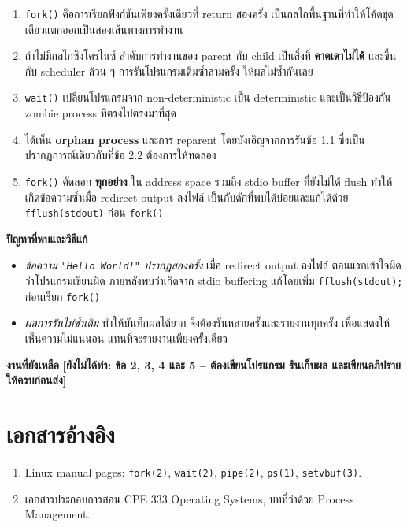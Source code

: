 \documentclass[a4paper,12pt]{article}
\newcommand{\code}[1]{\texttt{#1}}
\newcommand{\todo}[1]{\textcolor{todored}{\textbf{[ยังไม่ได้ทำ: #1]}}}
\begin{document}
\begin{enumerate}[leftmargin=*]
  \item \code{fork()} คือการเรียกฟังก์ชันเพียงครั้งเดียวที่ return สองครั้ง
        เป็นกลไกพื้นฐานที่ทำให้โค้ดชุดเดียวแตกออกเป็นสองเส้นทางการทำงาน
  \item ถ้าไม่มีกลไกซิงโครไนซ์ ลำดับการทำงานของ parent กับ child เป็นสิ่งที่
        \textbf{คาดเดาไม่ได้} และขึ้นกับ scheduler ล้วน ๆ การรันโปรแกรมเดิมซ้ำสามครั้ง
        ให้ผลไม่ซ้ำกันเลย
  \item \code{wait()} เปลี่ยนโปรแกรมจาก non-deterministic เป็น deterministic
        และเป็นวิธีป้องกัน zombie process ที่ตรงไปตรงมาที่สุด
  \item ได้เห็น \textbf{orphan process} และการ reparent โดยบังเอิญจากการรันข้อ 1.1
        ซึ่งเป็นปรากฏการณ์เดียวกับที่ข้อ 2.2 ต้องการให้ทดลอง
  \item \code{fork()} คัดลอก \textbf{ทุกอย่าง} ใน address space รวมถึง stdio buffer
        ที่ยังไม่ได้ flush ทำให้เกิดข้อความซ้ำเมื่อ redirect output ลงไฟล์
        เป็นกับดักที่พบได้บ่อยและแก้ได้ด้วย \code{fflush(stdout)} ก่อน \code{fork()}
\end{enumerate}

\textbf{ปัญหาที่พบและวิธีแก้}

\begin{itemize}[leftmargin=*]
  \item \emph{ข้อความ \code{"Hello World!"} ปรากฏสองครั้ง} เมื่อ redirect output ลงไฟล์
        ตอนแรกเข้าใจผิดว่าโปรแกรมเขียนผิด ภายหลังพบว่าเกิดจาก stdio buffering
        แก้โดยเพิ่ม \code{fflush(stdout);} ก่อนเรียก \code{fork()}
  \item \emph{ผลการรันไม่ซ้ำเดิม} ทำให้บันทึกผลได้ยาก จึงต้องรันหลายครั้งและรายงานทุกครั้ง
        เพื่อแสดงให้เห็นความไม่แน่นอน แทนที่จะรายงานเพียงครั้งเดียว
\end{itemize}

\textbf{งานที่ยังเหลือ} \quad \todo{ข้อ 2, 3, 4 และ 5 -- ต้องเขียนโปรแกรม
รันเก็บผล และเขียนอภิปรายให้ครบก่อนส่ง}

\section*{เอกสารอ้างอิง}
\begin{enumerate}[leftmargin=*]
  \item Linux manual pages: \code{fork(2)}, \code{wait(2)}, \code{pipe(2)}, \code{ps(1)},
        \code{setvbuf(3)}.
  \item เอกสารประกอบการสอน CPE 333 Operating Systems, บทที่ว่าด้วย Process Management.
\end{enumerate}
\end{document}
